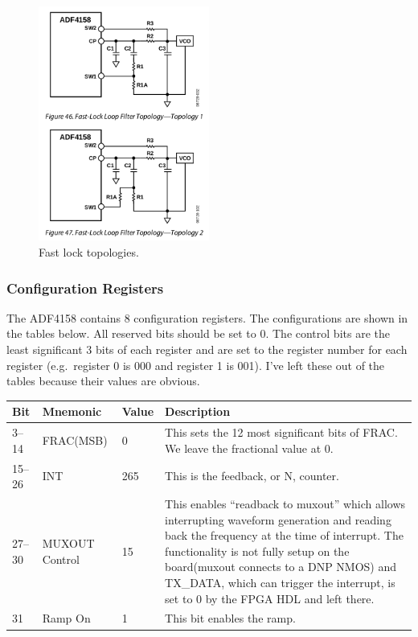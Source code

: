 \begin{figure}[h]
        \centering
        \includegraphics[width=0.5\textwidth]{data/adf4158-fast-lock.png}
        \caption{Fast lock topologies.}
        \label{fig:adf4158-fast-lock}
\end{figure}

\subsubsection{Configuration Registers}
\label{sec:adf4158-config-regs}

The ADF4158 contains 8 configuration registers. The configurations are shown in the tables
below. All reserved bits should be set to 0. The control bits are the least significant 3 bits of
each register and are set to the register number for each register (e.g.\ register 0 is 000 and
register 1 is 001). I've left these out of the tables because their values are obvious.

\label{tab:adf4158-reg-map-0}
\begin{tabularx}{\textwidth}{l l l X}
        \caption{FRAC/INT REGISTER (R0) MAP} \\
        \toprule
        Bit & Mnemonic & Value & Description \\
        \midrule

        3--14  & FRAC(MSB)      & 0   & This sets the 12 most significant bits of FRAC\@. We leave the
        fractional value at 0.                                               \\
        15--26 & INT            & 265 & This is the feedback, or N, counter. \\
        27--30 & MUXOUT Control & 15  & This enables ``readback to muxout'' which allows interrupting
        waveform generation and reading back the frequency at the time of interrupt. The
        functionality is not fully setup on the board(muxout connects to a DNP NMOS) and TX\_DATA,
        which can trigger the
        interrupt, is set to 0 by the FPGA HDL and left there.               \\
        31     & Ramp On        & 1   & This bit enables the ramp.           \\

        \bottomrule
\end{tabularx}

